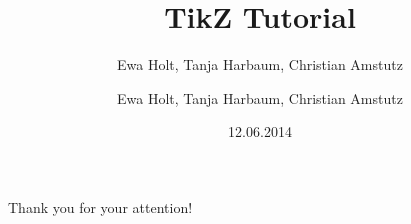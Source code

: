 \documentclass[t]{beamer}
\date{12.06.2014}
\title[]{TikZ Tutorial}
\subtitle{Ewa Holt, Tanja Harbaum, Christian Amstutz%
}
\author[]{Ewa Holt, Tanja Harbaum, Christian Amstutz}
\institute[]{KSETA Doctoral Workshop 2014}
\begin{document}

\begin{frame}
  \maketitle
\end{frame}


\begin{frame}[c]
  
  \Huge Thank you for your attention!
  
\end{frame}

\end{document}
